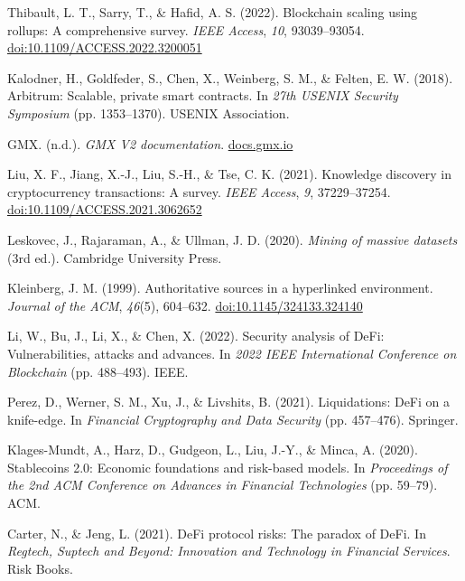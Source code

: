 \begin{enumerate}[label={[\arabic*]}, leftmargin=*, itemsep=0.35em, parsep=0pt]
  \item{}\label{ref:44} Thibault, L. T., Sarry, T., \& Hafid, A. S. (2022). Blockchain scaling using rollups: A comprehensive survey. \textit{IEEE Access}, \textit{10}, 93039--93054. \href{https://doi.org/10.1109/ACCESS.2022.3200051}{doi:10.1109/ACCESS.2022.3200051}
  \item{}\label{ref:45} Kalodner, H., Goldfeder, S., Chen, X., Weinberg, S. M., \& Felten, E. W. (2018). Arbitrum: Scalable, private smart contracts. In \textit{27th USENIX Security Symposium} (pp. 1353--1370). USENIX Association.
  \item{}\label{ref:46} GMX. (n.d.). \textit{GMX V2 documentation}. \href{https://docs.gmx.io/}{docs.gmx.io}
  \item{}\label{ref:47} Liu, X. F., Jiang, X.-J., Liu, S.-H., \& Tse, C. K. (2021). Knowledge discovery in cryptocurrency transactions: A survey. \textit{IEEE Access}, \textit{9}, 37229--37254. \href{https://doi.org/10.1109/ACCESS.2021.3062652}{doi:10.1109/ACCESS.2021.3062652}
  \item{}\label{ref:48} Leskovec, J., Rajaraman, A., \& Ullman, J. D. (2020). \textit{Mining of massive datasets} (3rd ed.). Cambridge University Press.
  \item{}\label{ref:49} Kleinberg, J. M. (1999). Authoritative sources in a hyperlinked environment. \textit{Journal of the ACM}, \textit{46}(5), 604--632. \href{https://doi.org/10.1145/324133.324140}{doi:10.1145/324133.324140}
  \item{}\label{ref:50} Li, W., Bu, J., Li, X., \& Chen, X. (2022). Security analysis of DeFi: Vulnerabilities, attacks and advances. In \textit{2022 IEEE International Conference on Blockchain} (pp. 488--493). IEEE.
  \item{}\label{ref:51} Perez, D., Werner, S. M., Xu, J., \& Livshits, B. (2021). Liquidations: DeFi on a knife-edge. In \textit{Financial Cryptography and Data Security} (pp. 457--476). Springer.
  \item{}\label{ref:52} Klages-Mundt, A., Harz, D., Gudgeon, L., Liu, J.-Y., \& Minca, A. (2020). Stablecoins 2.0: Economic foundations and risk-based models. In \textit{Proceedings of the 2nd ACM Conference on Advances in Financial Technologies} (pp. 59--79). ACM.
  \item{}\label{ref:53} Carter, N., \& Jeng, L. (2021). DeFi protocol risks: The paradox of DeFi. In \textit{Regtech, Suptech and Beyond: Innovation and Technology in Financial Services}. Risk Books.

\end{enumerate}
